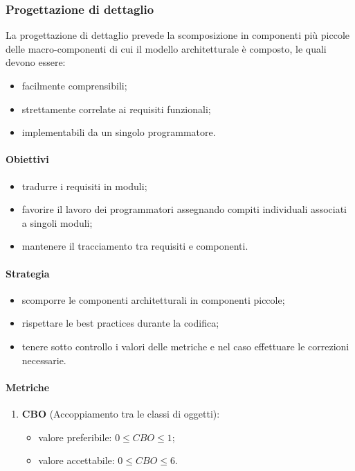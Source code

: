     \subsubsection{Progettazione di dettaglio}
        La progettazione di dettaglio prevede la scomposizione in componenti pi\`{u} piccole delle macro-componenti di cui il modello architetturale è composto, le quali devono essere:
        \begin{itemize}
            \item facilmente comprensibili;
            \item strettamente correlate ai requisiti funzionali;
            \item implementabili da un singolo programmatore.
        \end{itemize}
        \paragraph{Obiettivi}
            \begin{itemize}
                \item tradurre i requisiti in moduli;
                \item favorire il lavoro dei programmatori assegnando compiti individuali associati a singoli moduli;
                \item mantenere il tracciamento tra requisiti e componenti.
            \end{itemize}
        \paragraph{Strategia}
            \begin{itemize}
                \item scomporre le componenti architetturali in componenti piccole;
                \item rispettare le best practices durante la codifica;
                \item tenere sotto controllo i valori delle metriche e nel caso effettuare le correzioni necessarie.
            \end{itemize}
        \paragraph{Metriche}
            \begin{enumerate}
                \item \textbf{CBO} (Accoppiamento tra le classi di oggetti):
                \begin{itemize}
                    \item valore preferibile: $0 \leq CBO\leq 1$;
                    \item valore accettabile: $0 \leq CBO\leq 6$.
                \end{itemize}
            \end{enumerate}
